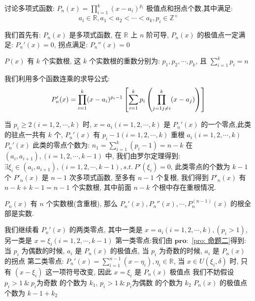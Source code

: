 \begin{proposition}\label{pro: 命题三}
	讨论多项式函数: $P_{n}(x) = \prod\limits_{i=1}^{k}(x-a_{i})^{p_{i}}$ 极值点和拐点个数,其中满足:
	$$a_{i}\in\mathbb{R}, a_{1}<a_{2}<\cdots<a_{k}, p_{i}\in \mathbb{Z}^{+}$$
\end{proposition}

\begin{anymark}[证明]
	我们首先有: $P_{n}(x)$ 是多项式函数, 在 $\mathbb{R}$ 上 $n$ 阶可导, $P_{n}(x)$ 的极值点一定满足: $P_{n}'(x) = 0$, 拐点满足: $P_{n}''(x) = 0$

	$P(x)$ 有 $k$ 个实数根, 这 $k$ 个实数根的重数分别为: $p_{1},p_{2},\cdots,p_{k}$, 且 $\sum\limits_{i=1}^{k}p_{i}= n$

	我们利用多个函数连乘的求导公式:
	$$P_{n}'(x) =  \prod\limits_{i=1}^{k}(x-a_{i})^{p_{i}-1}\left[\sum\limits_{i=1}^{k}p_{i}\left(\prod\limits_{j=1\\j\neq i}^{k}(x-a_{j})\right)\right]$$

	当 $p_{i} \geq 2 (i = 1,2,\cdots,k)$ 时, $x=a_{i}(i=1,2,\cdots,k)$ 是 $P_{n}'(x)$ 的一个零点,此类的驻点一共有 $k$ 个, $P_{n}'(x)$ 有 $p_{i}-1 (i=1,2,\cdots,k)$ 重根 $a_{i}(i=1,2,\cdots,k)$
	$P_{n}'(x)$ 此类的零点个数为: $n_{1} = \sum\limits_{i=1}^{k}(p_{i}-1) = n-k$
	在 $(a_{i},a_{i+1}),(i=1,2,\cdots,k-1)$ 中, 我们由罗尔定理得到: $\exists \xi_{i}\in(a_{i},a_{i+1}),(i=1,2,\cdots,k-1), s.t.\ P'(\xi_{i}) = 0$, 此类零点的个数为 $k-1$ 个
	$P'_{n}(x)$ 是 $n-1$ 次多项式函数, 至多有 $n-1$ 个复根, 我们得到 $P'_{n}(x)$ 有 $n-k+k-1 = n-1$ 个实数根, 其中前面 $n-k$ 个根中存在重根情况.
	\begin{corollary}[多项式函数零点]
		$P_{n}(x)$ 有 $n$ 个实数根(含重根), 那么 $P_{n}'(x),P_{n}''(x),\cdots,P_{n}^{(n-1)}(x)$ 的根全部是实数.
	\end{corollary}

	我们继续看 $P_{n}'(x)$ 的两类零点, 其中一类是 $x=a_{i}(i=1,2,\cdots,k),(p_{i}>1)$, 另一类是 $x=\xi_{i}(i=1,2,\cdots,k-1)$
	第一类零点:我们由 $\mathbf{pro: }$ \ref{pro: 命题二}得到: 当 $p_{i}$ 为偶数的时候, $a_{i}$ 是 $P_{n}(x)$ 的极值点, 当 $p_{i}$ 为奇数的时候, $a_{i}$ 是 $P_{n}(x)$ 的拐点
	第二类零点: $P_{n}'(x) = \sum\limits_{i=1}^{n-1}(x-\eta_{i}),\eta_{i}\in\mathbb{R}$, 当 $x\in U(\xi_{i},\delta)$ 时, 只有 $(x-\xi_{i})$ 这一项符号改变, 因此 $x=\xi_{i}$ 是 $P_{n}(x)$ 极值点
	我们不妨假设 $p_{i} > 1\ \&\ p_{i}\text{为奇数}$ 的个数为 $k_{1}$, $p_{i} > 1\ \&\ p_{i}\text{为偶数}$ 的个数为 $k_{2}$
	$P_{n}(x)$ 的极值点个数为 $k-1+k_{2}$


\end{anymark}
